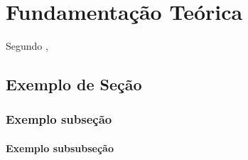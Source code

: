 
\chapter{Fundamentação Teórica}
Segundo \cite{Andreoli2016}, 

\section{Exemplo de Seção}

\subsection{Exemplo subseção}

\subsubsection{Exemplo subsubseção}

